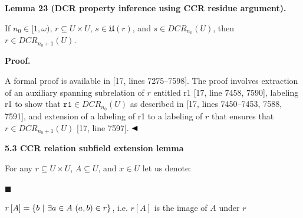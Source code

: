  
 
\par\medskip\noindent\textbf{Lemma 23 (DCR property inference using CCR residue argument).}\par
 
 
If $n_{0}\in[1,\omega)$, $r\subseteq U\times U$, $s\in\mathfrak{U}(r)$, and $s\in DCR_{n_{0}}(U)$, then $r\in DCR_{n_{0}+1}(U)$.\par
 
 
 
 
\par\medskip\noindent\textbf{Proof.}\par
 
 
A formal proof is available in [17, lines 7275–7598]. The proof involves extraction of an auxiliary spanning subrelation of $r$ entitled r1 [17, line 7458, 7590], labeling r1 to show that $\texttt{r1}\in DCR_{n_{0}}(U)$ as described in [17, lines 7450–7453, 7588, 7591], and extension of a labeling of r1 to a labeling of $r$ that ensures that $r\in DCR_{n_{0}+1}(U)$ [17, line 7597]. $\hfill\blacktriangleleft$\par
 
 
 
 
 
\par\medskip\noindent\textbf{5.3 CCR relation subfield extension lemma}\par
 
 
For any $r\subseteq U\times U$, $A\subseteq U$, and $x\in U$ let us denote:\par
  
\par\noindent  $\blacksquare$ 
 
$r\left[A\right]=\{b\leavevmode\nobreak\ |\leavevmode\nobreak\ \exists a\in A%
\leavevmode\nobreak\ (a,b)\in r\}$, i.e. $r\left[A\right]$ is the image of $A$ under $r$\par
 
